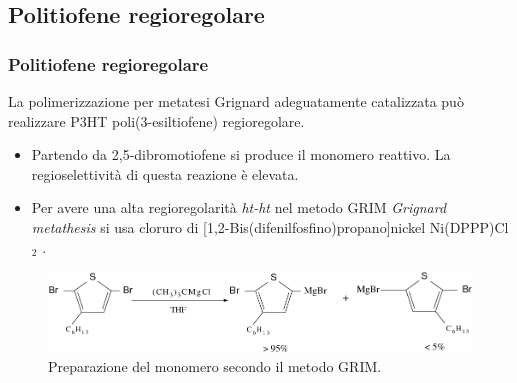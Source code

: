 \documentclass{beamer}
\begin{document}
  \subsection{Politiofene regioregolare}
    \begin{frame}
      \frametitle{
Politiofene regioregolare}

	La polimerizzazione per metatesi Grignard adeguatamente catalizzata può realizzare P3HT poli(3-esiltiofene) regioregolare.
	 
	
	\begin{itemize}
	  \item Partendo da 2,5-dibromotiofene si produce il monomero reattivo. La regioselettività di questa reazione è elevata.
	  \item Per avere una alta regioregolarità \emph{ht-ht} nel metodo GRIM \emph{Grignard metathesis} si usa cloruro di [1,2-Bis(difenilfosfino)propano]nickel Ni(DPPP)Cl$_2$ \citep{pol-p3ht-end}.
	\end{itemize}
	\begin{figure}
	  \includegraphics[scale=0.35]{immagini/tiofene+mg.png}\caption{Preparazione del monomero secondo il metodo GRIM.}
	\end{figure}
    \end{frame}
\end{document}
